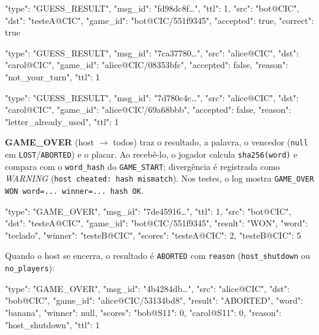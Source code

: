\documentclass[11pt,a4paper]{article}
\begin{document}
\begin{codigo}
{
  "type": "GUESS_RESULT",
  "msg_id": "fd98dc8f…",
  "ttl": 1,
  "src": "bot@CIC",
  "dst": "testeA@CIC",
  "game_id": "bot@CIC/551f9345",
  "accepted": true,
  "correct": true
}
\end{codigo}
\begin{codigo}
{
  "type": "GUESS_RESULT",
  "msg_id": "7ca37780…",
  "src": "alice@CIC",
  "dst": "carol@CIC",
  "game_id": "alice@CIC/08353bfc",
  "accepted": false,
  "reason": "not_your_turn",
  "ttl": 1
}
\end{codigo}
\begin{codigo}
{
  "type": "GUESS_RESULT",
  "msg_id": "7d780c4c…",
  "src": "alice@CIC",
  "dst": "carol@CIC",
  "game_id": "alice@CIC/69a68bbb",
  "accepted": false,
  "reason": "letter_already_used",
  "ttl": 1
}
\end{codigo}
\textbf{GAME\_OVER} (host $\rightarrow$ todos) traz o resultado, a palavra, o vencedor (\texttt{null} em \texttt{LOST}/\texttt{ABORTED}) e o placar. Ao recebê-lo, o jogador calcula \texttt{sha256(word)} e compara com o \texttt{word\_hash} do \texttt{GAME\_START}; divergência é registrada como \emph{WARNING} (\texttt{host cheated: hash mismatch}). Nos testes, o log mostra \texttt{GAME\_OVER WON word=... winner=... \textemdash{} hash OK}.
\begin{codigo}
{
  "type": "GAME_OVER",
  "msg_id": "7de45916…",
  "ttl": 1,
  "src": "bot@CIC",
  "dst": "testeA@CIC",
  "game_id": "bot@CIC/551f9345",
  "result": "WON",
  "word": "teclado",
  "winner": "testeB@CIC",
  "scores": {"testeA@CIC": 2, "testeB@CIC": 5}
}
\end{codigo}
Quando o host se encerra, o resultado é \texttt{ABORTED} com \texttt{reason} (\texttt{host\_shutdown} ou \texttt{no\_players}):
\begin{codigo}
{
  "type": "GAME_OVER",
  "msg_id": "4b4284db…",
  "src": "alice@CIC",
  "dst": "bob@CIC",
  "game_id": "alice@CIC/53134bd8",
  "result": "ABORTED",
  "word": "banana",
  "winner": null,
  "scores": {"bob@S11": 0, "carol@S11": 0},
  "reason": "host_shutdown",
  "ttl": 1
}
\end{codigo}
\end{document}
